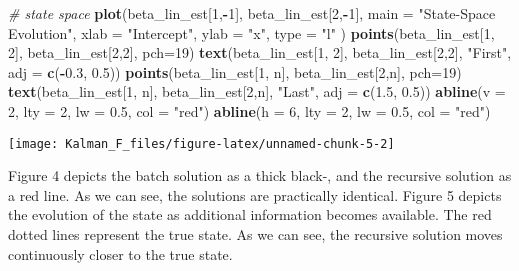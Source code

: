 \documentclass[
]{article}
\newenvironment{Shaded}{\begin{snugshade}}{\end{snugshade}}
\newcommand{\CommentTok}[1]{\textcolor[rgb]{0.56,0.35,0.01}{\textit{#1}}}
\newcommand{\DataTypeTok}[1]{\textcolor[rgb]{0.13,0.29,0.53}{#1}}
\newcommand{\DecValTok}[1]{\textcolor[rgb]{0.00,0.00,0.81}{#1}}
\newcommand{\FloatTok}[1]{\textcolor[rgb]{0.00,0.00,0.81}{#1}}
\newcommand{\KeywordTok}[1]{\textcolor[rgb]{0.13,0.29,0.53}{\textbf{#1}}}
\newcommand{\NormalTok}[1]{#1}
\newcommand{\OperatorTok}[1]{\textcolor[rgb]{0.81,0.36,0.00}{\textbf{#1}}}
\newcommand{\StringTok}[1]{\textcolor[rgb]{0.31,0.60,0.02}{#1}}
\begin{document}
\begin{Shaded}
\begin{Highlighting}[]
\CommentTok{# state space}
\KeywordTok{plot}\NormalTok{(beta_lin_est[}\DecValTok{1}\NormalTok{,}\OperatorTok{-}\DecValTok{1}\NormalTok{], beta_lin_est[}\DecValTok{2}\NormalTok{,}\OperatorTok{-}\DecValTok{1}\NormalTok{], }
    \DataTypeTok{main =} \StringTok{"State-Space Evolution"}\NormalTok{,}
    \DataTypeTok{xlab =} \StringTok{"Intercept"}\NormalTok{,}
    \DataTypeTok{ylab =} \StringTok{"x"}\NormalTok{,}
    \DataTypeTok{type =} \StringTok{"l"}
\NormalTok{)}
\KeywordTok{points}\NormalTok{(beta_lin_est[}\DecValTok{1}\NormalTok{, }\DecValTok{2}\NormalTok{], beta_lin_est[}\DecValTok{2}\NormalTok{,}\DecValTok{2}\NormalTok{], }\DataTypeTok{pch=}\DecValTok{19}\NormalTok{)}
\KeywordTok{text}\NormalTok{(beta_lin_est[}\DecValTok{1}\NormalTok{, }\DecValTok{2}\NormalTok{], beta_lin_est[}\DecValTok{2}\NormalTok{,}\DecValTok{2}\NormalTok{], }\StringTok{"First"}\NormalTok{, }\DataTypeTok{adj =} \KeywordTok{c}\NormalTok{(}\OperatorTok{-}\FloatTok{0.3}\NormalTok{, }\FloatTok{0.5}\NormalTok{))}
\KeywordTok{points}\NormalTok{(beta_lin_est[}\DecValTok{1}\NormalTok{, n], beta_lin_est[}\DecValTok{2}\NormalTok{,n], }\DataTypeTok{pch=}\DecValTok{19}\NormalTok{)}
\KeywordTok{text}\NormalTok{(beta_lin_est[}\DecValTok{1}\NormalTok{, n], beta_lin_est[}\DecValTok{2}\NormalTok{,n], }\StringTok{"Last"}\NormalTok{, }\DataTypeTok{adj =} \KeywordTok{c}\NormalTok{(}\FloatTok{1.5}\NormalTok{, }\FloatTok{0.5}\NormalTok{))}
\KeywordTok{abline}\NormalTok{(}\DataTypeTok{v =} \DecValTok{2}\NormalTok{, }\DataTypeTok{lty =} \DecValTok{2}\NormalTok{, }\DataTypeTok{lw =} \FloatTok{0.5}\NormalTok{, }\DataTypeTok{col =} \StringTok{"red"}\NormalTok{)}
\KeywordTok{abline}\NormalTok{(}\DataTypeTok{h =} \DecValTok{6}\NormalTok{, }\DataTypeTok{lty =} \DecValTok{2}\NormalTok{, }\DataTypeTok{lw =} \FloatTok{0.5}\NormalTok{, }\DataTypeTok{col =} \StringTok{"red"}\NormalTok{)}
\end{Highlighting}
\end{Shaded}

\begin{center}\texttt{[image: Kalman\_F\_files/figure-latex/unnamed-chunk-5-2]} \end{center}

Figure 4 depicts the batch solution as a thick black-, and the recursive
solution as a red line. As we can see, the solutions are practically
identical. Figure 5 depicts the evolution of the state as additional
information becomes available. The red dotted lines represent the true
state. As we can see, the recursive solution moves continuously closer
to the true state.
\end{document}
